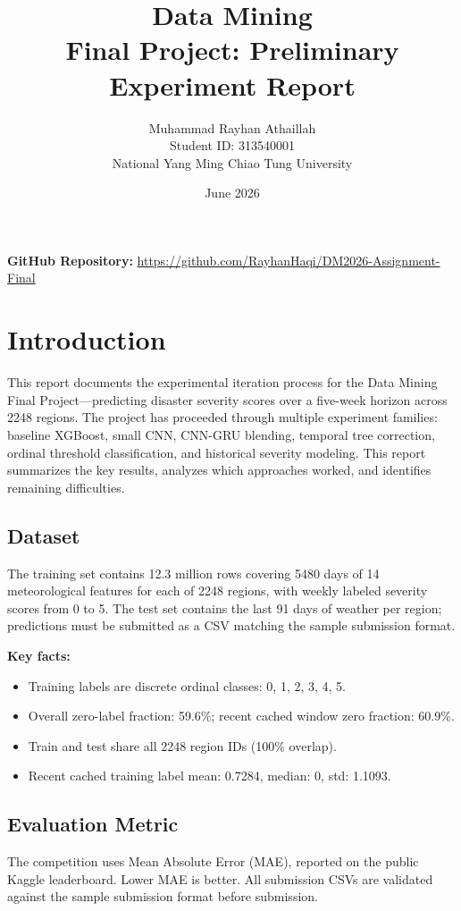 \documentclass[12pt, a4paper]{article}
\title{\textbf{Data Mining}\\ \large Final Project: Preliminary Experiment Report}
\author{
    Muhammad Rayhan Athaillah\\
    \small Student ID: 313540001\\
    \small National Yang Ming Chiao Tung University
}
\date{June 2026}
\begin{document}
\maketitle

\vspace{0.5cm}
\noindent \textbf{GitHub Repository:} \href{https://github.com/RayhanHaqi/DM2026-Assignment-Final}{https://github.com/RayhanHaqi/DM2026-Assignment-Final}

\section{Introduction}
This report documents the experimental iteration process for the Data Mining Final Project---predicting disaster severity scores over a five-week horizon across 2248 regions. The project has proceeded through multiple experiment families: baseline XGBoost, small CNN, CNN-GRU blending, temporal tree correction, ordinal threshold classification, and historical severity modeling. This report summarizes the key results, analyzes which approaches worked, and identifies remaining difficulties.

\subsection{Dataset}
The training set contains 12.3 million rows covering 5480 days of 14 meteorological features for each of 2248 regions, with weekly labeled severity scores from 0 to 5. The test set contains the last 91 days of weather per region; predictions must be submitted as a CSV matching the sample submission format.

\textbf{Key facts:}
\begin{itemize}
    \item Training labels are discrete ordinal classes: 0, 1, 2, 3, 4, 5.
    \item Overall zero-label fraction: 59.6\%; recent cached window zero fraction: 60.9\%.
    \item Train and test share all 2248 region IDs (100\% overlap).
    \item Recent cached training label mean: 0.7284, median: 0, std: 1.1093.
\end{itemize}

\subsection{Evaluation Metric}
The competition uses Mean Absolute Error (MAE), reported on the public Kaggle leaderboard. Lower MAE is better. All submission CSVs are validated against the sample submission format before submission.
\end{document}
